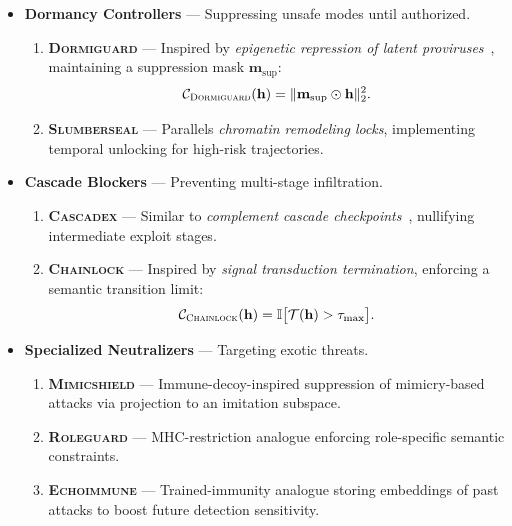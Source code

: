 \begin{itemize}
    \item \textbf{Dormancy Controllers} — Suppressing unsafe modes until authorized.
    \begin{enumerate}
        \item \textbf{\textsc{Dormiguard}} — Inspired by \emph{epigenetic repression of latent proviruses}~\cite{roychoudhury2020herpesvirus,jaenisch2003epigenetic}, maintaining a suppression mask $\mathbf{m}_\mathrm{sup}$:
        \[
        \mathcal{C}_{\textsc{Dormiguard}}(\mathbf{h}) = \|\mathbf{m}_\mathrm{sup} \odot \mathbf{h}\|_2^2.
        \]
        
        \item \textbf{\textsc{Slumberseal}} — Parallels \emph{chromatin remodeling locks}, implementing temporal unlocking for high-risk trajectories.
    \end{enumerate}

    \item \textbf{Cascade Blockers} — Preventing multi-stage infiltration.
    \begin{enumerate}
        \item \textbf{\textsc{Cascadex}} — Similar to \emph{complement cascade checkpoints}~\cite{walport2001complement}, nullifying intermediate exploit stages.

        \item \textbf{\textsc{Chainlock}} — Inspired by \emph{signal transduction termination}, enforcing a semantic transition limit:
        \[
        \mathcal{C}_{\textsc{Chainlock}}(\mathbf{h}) = \mathbb{I}\big[\mathcal{T}(\mathbf{h}) > \tau_{\max}\big].
        \]
    \end{enumerate}

    \item \textbf{Specialized Neutralizers} — Targeting exotic threats.
    \begin{enumerate}
        \item \textbf{\textsc{Mimicshield}} — Immune-decoy-inspired suppression of mimicry-based attacks via projection to an imitation subspace.
        
        \item \textbf{\textsc{Roleguard}} — MHC-restriction analogue enforcing role-specific semantic constraints.
        
        \item \textbf{\textsc{Echoimmune}} — Trained-immunity analogue storing embeddings of past attacks to boost future detection sensitivity.
    \end{enumerate}
\end{itemize}

